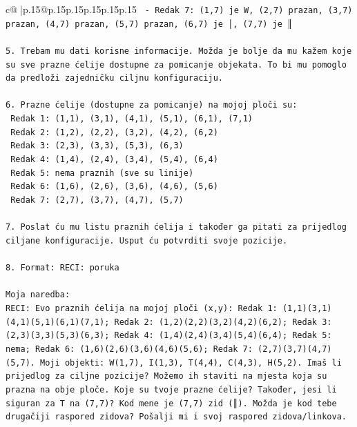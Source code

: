\documentclass{article}
\begin{document}
{\begin{supertabular}{c@{$\;$}|p{.15\linewidth}@{}p{.15\linewidth}p{.15\linewidth}p{.15\linewidth}p{.15\linewidth}p{.15\linewidth}}
{{{\texttt{   {-} Redak 7: (1,7) je W, (2,7) prazan, (3,7) prazan, (4,7) prazan, (5,7) prazan, (6,7) je │, (7,7) je ║} \\
\\ 
\texttt{5. Trebam mu dati korisne informacije. Možda je bolje da mu kažem koje su sve prazne ćelije dostupne za pomicanje objekata. To bi mu pomoglo da predloži zajedničku ciljnu konfiguraciju.} \\
\\ 
\texttt{6. Prazne ćelije (dostupne za pomicanje) na mojoj ploči su:} \\
\texttt{   Redak 1: (1,1), (3,1), (4,1), (5,1), (6,1), (7,1)} \\
\texttt{   Redak 2: (1,2), (2,2), (3,2), (4,2), (6,2)} \\
\texttt{   Redak 3: (2,3), (3,3), (5,3), (6,3)} \\
\texttt{   Redak 4: (1,4), (2,4), (3,4), (5,4), (6,4)} \\
\texttt{   Redak 5: nema praznih (sve su linije)} \\
\texttt{   Redak 6: (1,6), (2,6), (3,6), (4,6), (5,6)} \\
\texttt{   Redak 7: (2,7), (3,7), (4,7), (5,7)} \\
\\ 
\texttt{7. Poslat ću mu listu praznih ćelija i također ga pitati za prijedlog ciljane konfiguracije. Usput ću potvrditi svoje pozicije.} \\
\\ 
\texttt{8. Format: RECI: poruka} \\
\\ 
\texttt{Moja naredba:} \\
\texttt{RECI: Evo praznih ćelija na mojoj ploči (x,y): Redak 1: (1,1)(3,1)(4,1)(5,1)(6,1)(7,1); Redak 2: (1,2)(2,2)(3,2)(4,2)(6,2); Redak 3: (2,3)(3,3)(5,3)(6,3); Redak 4: (1,4)(2,4)(3,4)(5,4)(6,4); Redak 5: nema; Redak 6: (1,6)(2,6)(3,6)(4,6)(5,6); Redak 7: (2,7)(3,7)(4,7)(5,7). Moji objekti: W(1,7), I(1,3), T(4,4), C(4,3), H(5,2). Imaš li prijedlog za ciljne pozicije? Možemo ih staviti na mjesta koja su prazna na obje ploče. Koje su tvoje prazne ćelije? Također, jesi li siguran za T na (7,7)? Kod mene je (7,7) zid (║). Možda je kod tebe drugačiji raspored zidova? Pošalji mi i svoj raspored zidova/linkova.} \\
            }
        }
    }
     \\ \\


\end{supertabular}}
\end{document}
